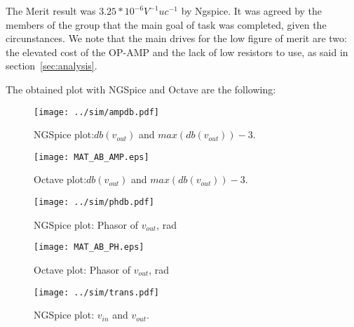 The Merit result was $3.25*10^{-6}V^{-1}uc^{-1}$ by Ngspice. It was agreed by the members of the group that the main goal of task was completed, given the circunstances. 
We note that the main drives for the low figure of merit are two: the elevated cost of the OP-AMP and the lack of low resistors to use, as said in section~\ref{sec:analysis}.

\newpage
The obtained plot with NGSpice and Octave are the following:

\begin{figure}[h] \centering
	\vspace{-3cm}
	\texttt{[image: ../sim/ampdb.pdf]}
	\caption{NGSpice plot:$db(v_{out})$ and $max(db(v_{out}))-3$.}
	\label{fig:CON_MAT_OUT}
\end{figure}

\begin{figure}[h] \centering
	\texttt{[image: MAT\_AB\_AMP.eps]}
	\caption{Octave plot:$db(v_{out})$ and $max(db(v_{out}))-3$.}
	\label{fig:CON_SIM_OUT}
\end{figure}

\newpage

\begin{figure}[h] \centering
	\vspace{-3cm}
	\texttt{[image: ../sim/phdb.pdf]}
	\caption{NGSpice plot: Phasor of $v_{out}$, rad}
	\label{fig:CON_MAT_PH}
\end{figure}

\begin{figure}[h] \centering
	\texttt{[image: MAT\_AB\_PH.eps]}
	\caption{Octave plot: Phasor of $v_{out}$, rad}
	\label{fig:CON_SIM_PH}
\end{figure}

\newpage

\begin{figure}[h] \centering
	\vspace{-3cm}
	\texttt{[image: ../sim/trans.pdf]}
	\caption{NGSpice plot: $v_{in}$ and $v_{out}$.}
	\label{fig:CON_SIM_TRANS}
\end{figure}
